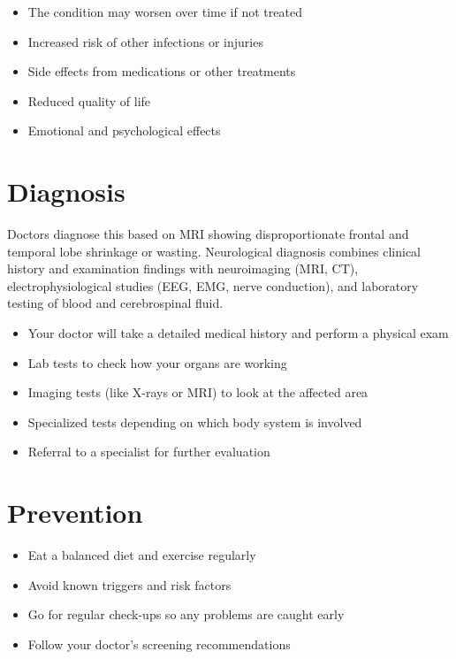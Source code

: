 \begin{itemize}[noitemsep]
  \item The condition may worsen over time if not treated
  \item Increased risk of other infections or injuries
  \item Side effects from medications or other treatments
  \item Reduced quality of life
  \item Emotional and psychological effects
\end{itemize}

\section{Diagnosis}
Doctors diagnose this based on MRI showing disproportionate frontal and temporal lobe shrinkage or wasting. Neurological diagnosis combines clinical history and examination findings with neuroimaging (MRI, CT), electrophysiological studies (EEG, EMG, nerve conduction), and laboratory testing of blood and cerebrospinal fluid.

\begin{itemize}[noitemsep]
  \item Your doctor will take a detailed medical history and perform a physical exam
  \item Lab tests to check how your organs are working
  \item Imaging tests (like X-rays or MRI) to look at the affected area
  \item Specialized tests depending on which body system is involved
  \item Referral to a specialist for further evaluation
\end{itemize}

\section{Prevention}

\begin{itemize}[noitemsep]
  \item Eat a balanced diet and exercise regularly
  \item Avoid known triggers and risk factors
  \item Go for regular check-ups so any problems are caught early
  \item Follow your doctor's screening recommendations
\end{itemize}

